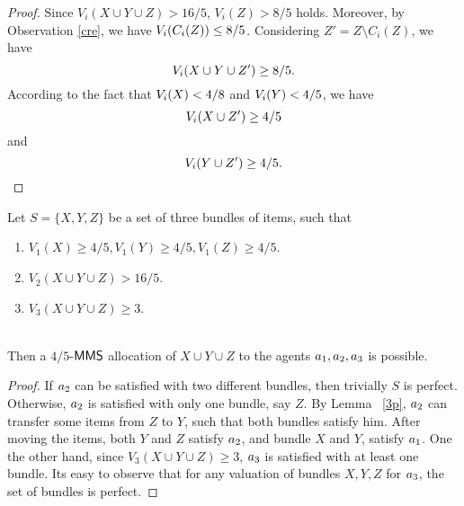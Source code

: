 \begin{proof}
Since $V_i(X \cup Y \cup Z ) > 16/5$, $V_i(Z) > 8/5$ holds. Moreover, by Observation \ref{cre}, we have $V_i(C_i(Z)) \leq 8/5$. Considering $Z' = Z \setminus C_i(Z)$, we have   
$$V_i(X \cup Y \cup Z' ) \geq 8/5.$$
According to the fact that $V_i(X)<4/8$ and $V_i(Y)<4/5$, we have 
$$V_i(X \cup Z' ) \geq 4/5$$
and 
$$V_i(Y \cup Z' ) \geq 4/5.$$


\end{proof}

\begin{lemma}
\label{recurse}
Let $S= \{X,Y,Z\}$ be a set of three bundles of items, such that 

\begin{minipage}[t]{\linegoal}
\begin{enumerate}[leftmargin=*]
 \item $V_1(X) \ge 4/5 , V_1(Y) \ge 4/5, V_1(Z) \ge 4/5 $. 
\item $V_2(X \cup Y \cup Z) > 16/5$.
\item $V_3(X \cup Y \cup Z) \ge 3 $.
 
\end{enumerate}
\end{minipage}
\\

Then a $4/5$-$\mathsf{MMS}$ allocation of $X \cup Y \cup Z$ to the agents $a_1,a_2,a_3$ is possible.
\end{lemma}
\begin{proof}
If $a_2$ can be satisfied with two different bundles, then trivially $S$ is perfect. Otherwise, $a_2$ is satisfied with only one bundle, say $Z$. By Lemma ~\ref{3p}, $a_2$ can transfer some items from $Z$ to $Y$, such that both bundles satisfy him.  After moving the items, both $Y$ and $Z$ satisfy $a_2$, and bundle $X$ and $Y$, satisfy $a_1$. One the other hand,   since $V_3(X \cup Y \cup Z) \ge 3 $, $a_3$ is satisfied with at least one bundle. Its easy to observe that for any valuation of bundles $X,Y,Z$ for $a_3$, the set of bundles is perfect.
\end{proof}


